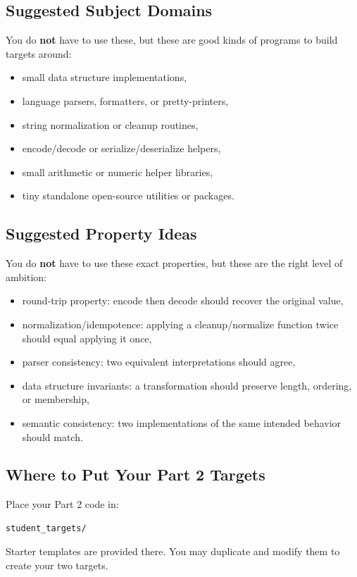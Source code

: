 \documentclass[11pt]{article}
\begin{document}
\subsection*{Suggested Subject Domains}
You do \textbf{not} have to use these, but these are good kinds of programs to build targets around:
\begin{itemize}
    \item small data structure implementations,
    \item language parsers, formatters, or pretty-printers,
    \item string normalization or cleanup routines,
    \item encode/decode or serialize/deserialize helpers,
    \item small arithmetic or numeric helper libraries,
    \item tiny standalone open-source utilities or packages.
\end{itemize}

\subsection*{Suggested Property Ideas}
You do \textbf{not} have to use these exact properties, but these are the right level of ambition:
\begin{itemize}
    \item round-trip property: encode then decode should recover the original value,
    \item normalization/idempotence: applying a cleanup/normalize function twice should equal applying it once,
    \item parser consistency: two equivalent interpretations should agree,
    \item data structure invariants: a transformation should preserve length, ordering, or membership,
    \item semantic consistency: two implementations of the same intended behavior should match.
\end{itemize}

\subsection*{Where to Put Your Part 2 Targets}
Place your Part 2 code in:
\begin{lstlisting}[style=bashstyle]
student_targets/
\end{lstlisting}

Starter templates are provided there. You may duplicate and modify them to create your two targets.
\end{document}
